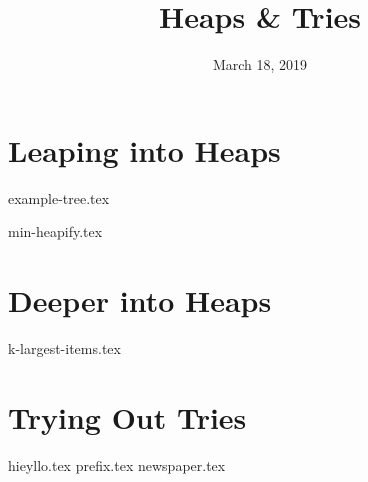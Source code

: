 \documentclass[11pt]{exam}
\title{Heaps \& Tries}
\date{March 18, 2019}
\begin{document}
\maketitle

\section{Leaping into Heaps}
{example-tree.tex}
\begin{questions}
{min-heapify.tex}
\end{questions}

\clearpage

\section{Deeper into Heaps}
\begin{questions}
{k-largest-items.tex}
\end{questions}

\clearpage

\section{Trying Out Tries}
\begin{questions}
{hieyllo.tex}
\clearpage
{prefix.tex}
{newspaper.tex}

\end{questions}
\end{document}
